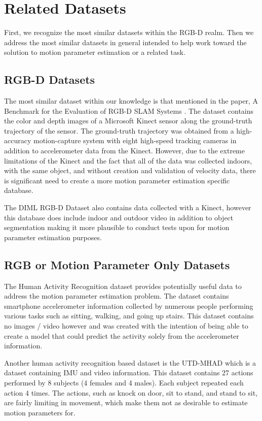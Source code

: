 \section{Related Datasets}
First, we recognize the most similar datasets within the RGB-D realm. Then we address the most similar datasets in general intended to help work toward the solution to motion parameter estimation or a related task.

\subsection{RGB-D Datasets}
The most similar dataset within our knowledge is that mentioned in the paper, A Benchmark for the Evaluation of RGB-D SLAM Systems \cite{sturm_benchmark_2012}. The dataset contains the color and depth images of a Microsoft Kinect sensor along the ground-truth trajectory of the sensor. The ground-truth trajectory was obtained from a high-accuracy motion-capture system with eight high-speed tracking cameras in addition to accelerometer data from the Kinect. However, due to the extreme limitations of the Kinect and the fact that all of the data was collected indoors, with the same object, and without creation and validation of velocity data, there is significant need to create a more motion parameter estimation specific database.

The DIML RGB-D Dataset \cite{kim_deep_2018} also contains data collected with a Kinect, however this database does include indoor and outdoor video in addition to object segmentation making it more plausible to conduct tests upon for motion parameter estimation purposes.

\subsection{RGB or Motion Parameter Only Datasets}
The Human Activity Recognition dataset \cite{anguita_public_2013} provides potentially useful data to address the motion parameter estimation problem. The dataset contains smartphone accelerometer information collected by numerous people performing various tasks such as sitting, walking, and going up stairs. This dataset contains no images / video however and was created with the intention of being able to create a model that could predict the activity solely from the accelerometer information.

Another human activity recognition based dataset is the UTD-MHAD \cite{chen_utd-mhad:_2015} which is a dataset containing IMU and video information. This dataset contains 27 actions performed by 8 subjects (4 females and 4 males). Each subject repeated each action 4 times. The actions, such as knock on door, sit to stand, and stand to sit, are fairly limiting in movement, which make them not as desirable to estimate motion parameters for.

